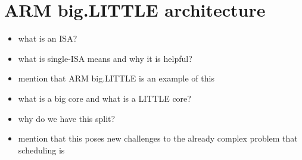 \section{ARM big.LITTLE architecture}
\begin{itemize}
    \item what is an ISA?
    \item what is single-ISA means and why it is helpful?
    \item mention that ARM big.LITTLE is an example of this
    \item what is a big core and what is a LITTLE core?
    \item why do we have this split?
    \item mention that this poses new challenges to the already complex problem
          that scheduling is
\end{itemize}
